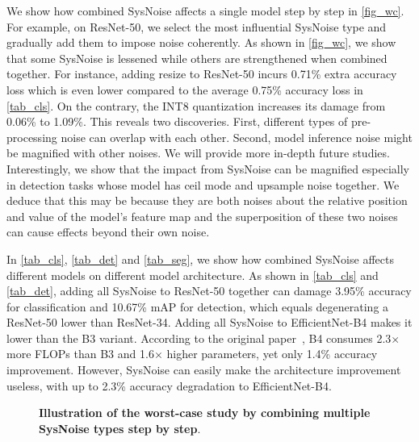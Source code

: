 We show how combined SysNoise affects a single model step by step in \autoref{fig_wc}. For example, on ResNet-50, we select the most influential SysNoise type and gradually add them to impose noise coherently. As shown in \autoref{fig_wc}, we show that some SysNoise is lessened while others are strengthened when combined together. For instance, adding resize to ResNet-50 incurs 0.71\% extra accuracy loss which is even lower compared to the average 0.75\% accuracy loss in \autoref{tab_cls}. On the contrary, the INT8 quantization increases its damage from 0.06\% to 1.09\%. This reveals two discoveries. First, different types of pre-processing noise can overlap with each other. Second, model inference noise might be magnified with other noises. We will provide more in-depth future studies. Interestingly, we show that the impact from SysNoise can be magnified especially in detection tasks whose model has ceil mode and upsample noise together. We deduce that this may be because they are both noises about the relative position and value of the model's feature map and the superposition of these two noises can cause effects beyond their own noise.

In \autoref{tab_cls}, \autoref{tab_det} and \autoref{tab_seg}, we show how combined SysNoise affects different models on different model architecture.
As shown in \autoref{tab_cls} and \autoref{tab_det}, adding all SysNoise to ResNet-50 together can damage 3.95\% accuracy for classification and 10.67\% mAP for detection, which equals degenerating a ResNet-50 lower than ResNet-34. Adding all SysNoise to EfficientNet-B4 makes it lower than the B3 variant. According to the original paper~\cite{tan2020efficientnet}, B4 consumes 2.3$\times$ more FLOPs than B3 and 1.6$\times$ higher parameters, yet only 1.4\% accuracy improvement. However, SysNoise can easily make the architecture improvement useless, with up to 2.3\% accuracy degradation to EfficientNet-B4.


\begin{figure}[htbp]
    \centering
    
    \caption{\textbf{Illustration of the worst-case study by combining multiple SysNoise types step by step}.}
    \label{fig_wc}
\end{figure}




